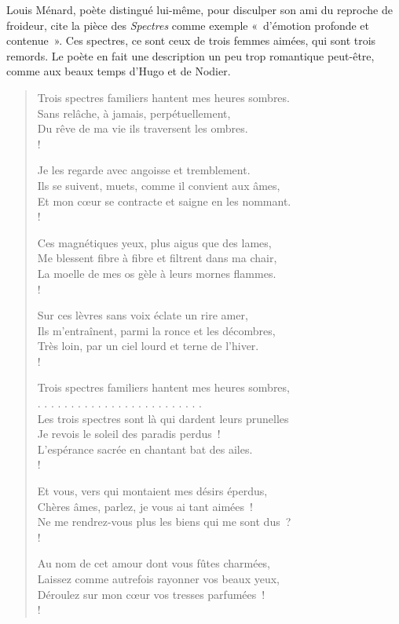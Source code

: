 \documentclass[french,twoside]{book} %
\begin{document}
\noindent Louis Ménard, poète distingué lui-même, pour disculper son ami du reproche de froideur, cite la pièce des \emph{Spectres} comme exemple « d’émotion profonde et contenue ». Ces spectres, ce sont ceux de trois femmes aimées, qui sont trois remords. Le poète en fait une description un peu trop romantique peut-être, comme aux beaux temps d’Hugo et de Nodier.\par


\begin{verse}
Trois spectres familiers hantent mes heures sombres.\\
Sans relâche, à jamais, perpétuellement,\\
Du rêve de ma vie ils traversent les ombres.\\!

Je les regarde avec angoisse et tremblement.\\
Ils se suivent, muets, comme il convient aux âmes,\\
Et mon cœur se contracte et saigne en les nommant.\\!

Ces magnétiques yeux, plus aigus que des lames,\\
Me blessent fibre à fibre et filtrent dans ma chair,\\
La moelle de mes os gèle à leurs mornes flammes.\\!

Sur ces lèvres sans voix éclate un rire amer,\\
Ils m’entraînent, parmi la ronce et les décombres,\\
Très loin, par un ciel lourd et terne de l’hiver.\\!

Trois spectres familiers hantent mes heures sombres,\\
. . . . . . . . . . . . . . . . . . . . . . . . .\\
Les trois spectres sont là qui dardent leurs prunelles\\
Je revois le soleil des paradis perdus !\\
L’espérance sacrée en chantant bat des ailes.\\!

Et vous, vers qui montaient mes désirs éperdus,\\
Chères âmes, parlez, je vous ai tant aimées !\\
Ne me rendrez-vous plus les biens qui me sont dus ?\\!

Au nom de cet amour dont vous fûtes charmées,\\
Laissez comme autrefois rayonner vos beaux yeux,\\
Déroulez sur mon cœur vos tresses parfumées !\\!


\end{verse}
\end{document}
